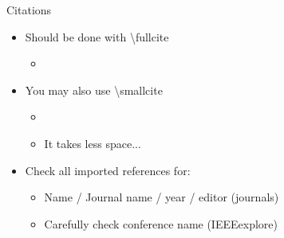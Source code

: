 \documentclass{thesisbeamer}
\begin{document}
\begin{frame}{Citations}
 
 \begin{itemize}[<+->]
  \item Should be done with \textbackslash{fullcite}
  \begin{itemize}[<.->]
   \item {}
  \end{itemize}\vfill
  \item You may also use \textbackslash{smallcite}
  \begin{itemize}[<.->]
   \item {}
   \item It takes less space...
  \end{itemize}\vfill
  \item Check all imported references for:
  \begin{itemize}[<.->]
   \item Name / Journal name / year / editor (journals)
   \item Carefully check conference name (IEEEexplore)
  \end{itemize}

 \end{itemize}
\end{frame}
\end{document}
